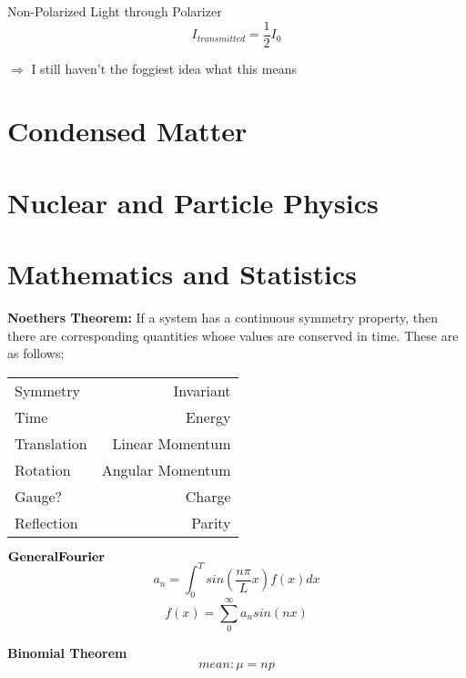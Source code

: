 \documentclass{article}
\begin{document}
Non-Polarized Light through Polarizer\begin{equation}I_{transmitted}=\frac{1}{2}I_0\end{equation}

$\Rightarrow$ I still haven't the foggiest idea what this means








\section{Condensed Matter}









\section{Nuclear and Particle Physics}









\section{Mathematics and Statistics}
{\bf Noethers Theorem:} If a system has a continuous symmetry property, then there are corresponding quantities whose values are conserved in time.  These are as follows:

\begin{tabular}{ l | r}
  Symmetry & Invariant\\
  Time & Energy\\
  Translation & Linear Momentum\\
  Rotation & Angular Momentum\\
  Gauge? & Charge\\
  Reflection & Parity\\
\end{tabular}

${\bf General Fourier}$ \begin{equation}a_n=\int_0^T sin(\frac{n\pi}{L}x)f(x)dx\end{equation}
\begin{equation}f(x)=\sum_0^{\infty} a_n sin(n x)\end{equation}

{\bf{Binomial Theorem}}\begin{equation}mean: \mu = np\end{equation}
\end{document}
